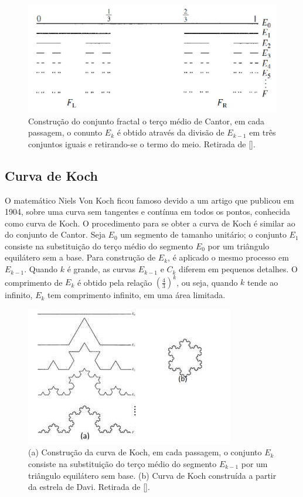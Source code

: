 \documentclass[brazil,ruledheader]{abnt}
\renewcommand{\cite}[1]{[\citeonline{#1}]}
\begin{document}
\begin{figure}[!h]
 \centering
\includegraphics[width= 0.9 \linewidth]{Figuras/figura7.jpg}
\caption [Construção do conjunto fractal o terço médio de Cantor]{Construção do
conjunto fractal o terço médio de Cantor, em cada
passagem, o conunto $E_k$ é obtido através da divisão de $E_{k-1}$ em três
conjuntos iguais e retirando-se o termo do meio. Retirada de \cite{HuDo62}.}
\label{fig:Cantor}
\end{figure}

\subsection{Curva de Koch}

O matemático Niels Von Koch ficou famoso devido a um artigo que publicou em
1904, sobre uma curva sem tangentes e contínua em todos os pontos, conhecida
como curva de Koch. O procedimento para se obter a curva de Koch é similar ao do
conjunto de Cantor. Seja $E_0$ um segmento de tamanho unitário; o conjunto $E_1$
consiste na substituição do terço médio do segmento $E_0$ por um triângulo
equilátero sem a base. Para construção de $E_k$, é aplicado o mesmo processo em
$E_{k-1}$. Quando $k$ é grande, as curvas $E_{k-1}$ e $C_k$ diferem em pequenos
detalhes. O comprimento de $E_k$ é obtido pela relação
$\left(\frac{4}{3}\right)^k$, ou seja, quando $k$ tende ao infinito, $E_k$ tem
comprimento infinito, em uma área limitada.

\begin{figure}[!h]
 \centering
\includegraphics[width= 0.6 \linewidth]{Figuras/figura8.jpg}
\caption[Construção da curva de Koch]{(a) Construção da curva de Koch, em cada
passagem, o conjunto $E_k$
consiste na substituição do terço médio do segmento $E_{k-1}$ por um triângulo
equilátero sem base. (b) Curva de Koch construída a partir da estrela de Davi.
Retirada de \cite{HuDo62}.}
\label{fig:Koch}
\end{figure}
\end{document}
